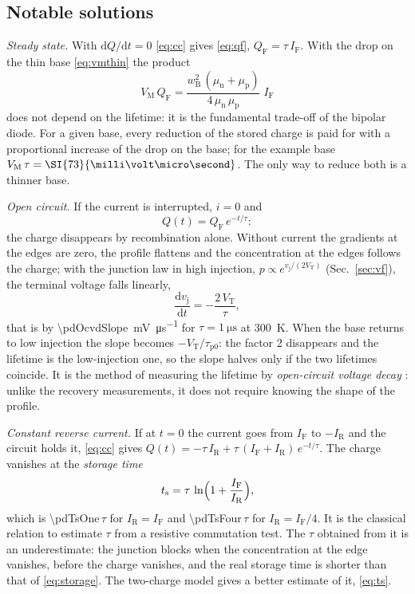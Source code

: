 \documentclass[10pt,a4paper]{scrartcl}
\newcommand{\IF}{I_\mathrm{F}}
\newcommand{\IR}{I_\mathrm{R}}
\newcommand{\ts}{t_\mathrm{s}}
\newcommand{\vj}{v_\mathrm{j}}
\newcommand{\VT}{V_\mathrm{T}}
\newcommand{\diff}{\mathrm{d}}
\newcommand{\wB}{w_\mathrm{B}}
\newcommand{\mun}{\mu_\mathrm{n}}
\newcommand{\mup}{\mu_\mathrm{p}}
\newcommand{\VM}{V_\mathrm{M}}
\newcommand{\QF}{Q_\mathrm{F}}
\begin{document}
\subsection{Notable solutions}
\label{sec:ccsolutions}
\emph{Steady state.} With $\diff Q/\diff t = 0$ \eqref{eq:cc} gives \eqref{eq:qf}, $\QF = \tau\,\IF$. With the drop on the thin base \eqref{eq:vmthin} the product
\begin{equation}
\VM\,\QF = \frac{\wB^2\,(\mun+\mup)}{4\,\mun\,\mup}\;\IF
\label{eq:tradeoff}
\end{equation}
does not depend on the lifetime: it is the fundamental trade-off of the bipolar diode. For a given base, every reduction of the stored charge is paid for with a proportional increase of the drop on the base; for the example base $\VM\,\tau = \SI{\pdExVmTau}{\milli\volt\micro\second}$. The only way to reduce both is a thinner base.

\emph{Open circuit.} If the current is interrupted, $i = 0$ and
\begin{equation}
Q(t) = \QF\,e^{-t/\tau} :
\label{eq:opencircuit}
\end{equation}
the charge disappears by recombination alone. Without current the gradients at the edges are zero, the profile flattens and the concentration at the edges follows the charge; with the junction law in high injection, $p \propto e^{\vj/(2\VT)}$ (Sec.~\ref{sec:vf}), the terminal voltage falls linearly,
\begin{equation}
\frac{\diff\vj}{\diff t} = -\frac{2\,\VT}{\tau} ,
\label{eq:ocvd}
\end{equation}
that is by \SI{\pdOcvdSlope}{\milli\volt\per\micro\second} for $\tau = \SI{1}{\micro\second}$ at \SI{300}{\kelvin}. When the base returns to low injection the slope becomes $-\VT/\tau_\mathrm{p0}$: the factor 2 disappears and the lifetime is the low-injection one, so the slope halves only if the two lifetimes coincide. It is the method of measuring the lifetime by \emph{open-circuit voltage decay} \cite{schroder}: unlike the recovery measurements, it does not require knowing the shape of the profile.

\emph{Constant reverse current.} If at $t = 0$ the current goes from $\IF$ to $-\IR$ and the circuit holds it, \eqref{eq:cc} gives $Q(t) = -\tau\,\IR + \tau\,(\IF + \IR)\,e^{-t/\tau}$. The charge vanishes at the \emph{storage time}
\begin{equation}
\ts = \tau\,\ln\Bigl(1 + \frac{\IF}{\IR}\Bigr) ,
\label{eq:storage}
\end{equation}
which is \num{\pdTsOne}\,$\tau$ for $\IR = \IF$ and \num{\pdTsFour}\,$\tau$ for $\IR = \IF/4$. It is the classical relation to estimate $\tau$ from a resistive commutation test. The $\tau$ obtained from it is an underestimate: the junction blocks when the concentration at the edge vanishes, before the charge vanishes, and the real storage time is shorter than that of \eqref{eq:storage}. The two-charge model gives a better estimate of it, \eqref{eq:ts}.
\end{document}
